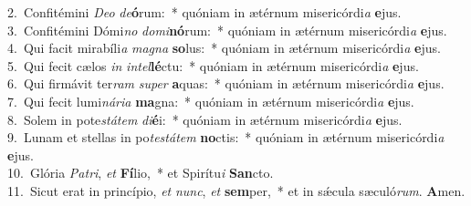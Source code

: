 {2.~}Confitémini \textit{De}\textit{o} \textit{de}\textbf{ó}rum:~* quóniam in ætérnum misericórdi\textit{a} \textbf{e}jus.\\
{3.~}Confitémini Dómi\textit{no} \textit{do}\textit{mi}\textbf{nó}rum:~* quóniam in ætérnum misericórdi\textit{a} \textbf{e}jus.\\
{4.~}Qui facit mirabíli\textit{a} \textit{ma}\textit{gna} \textbf{so}lus:~* quóniam in ætérnum misericórdi\textit{a} \textbf{e}jus.\\
{5.~}Qui fecit cælos \textit{in} \textit{in}\textit{tel}\textbf{lé}ctu:~* quóniam in ætérnum misericórdi\textit{a} \textbf{e}jus.\\
{6.~}Qui firmávit ter\textit{ram} \textit{su}\textit{per} \textbf{a}quas:~* quóniam in ætérnum misericórdi\textit{a} \textbf{e}jus.\\
{7.~}Qui fecit lumi\textit{ná}\textit{ri}\textit{a} \textbf{ma}gna:~* quóniam in ætérnum misericórdi\textit{a} \textbf{e}jus.\\
{8.~}Solem in pote\textit{stá}\textit{tem} \textit{di}\textbf{é}i:~* quóniam in ætérnum misericórdi\textit{a} \textbf{e}jus.\\
{9.~}Lunam et stellas in po\textit{te}\textit{stá}\textit{tem} \textbf{no}ctis:~* quóniam in ætérnum misericórdi\textit{a} \textbf{e}jus.\\
{10.~}Glória \textit{Pa}\textit{tri}, \textit{et} \textbf{Fí}lio,~* et Spirítu\textit{i} \textbf{San}cto.\\
{11.~}Sicut erat in princípio, \textit{et} \textit{nunc}, \textit{et} \textbf{sem}per,~* et in sǽcula sæculó\textit{rum}. \textbf{A}men.\\
